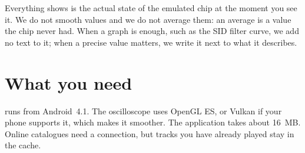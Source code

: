 Everything \soft shows is the actual state of the emulated chip at the moment you see it. We do not smooth values
and we do not average them: an average is a value the chip never had. When a graph is enough, such as the SID
filter curve, we add no text to it; when a precise value matters, we write it next to what it describes.

\section{What you need}
\soft runs from Android~4.1. The oscilloscope uses OpenGL ES, or Vulkan if your phone supports it, which makes it
smoother. The application takes about 16~MB. Online catalogues need a connection, but tracks you have already played
stay in the cache.
